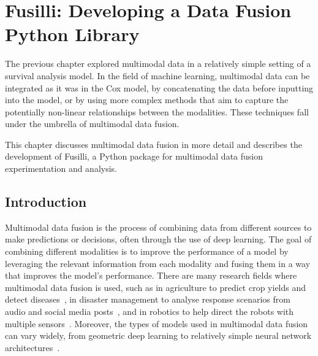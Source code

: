 \chapter{Fusilli: Developing a Data Fusion Python Library}
\label{fusilli_development}

The previous chapter explored multimodal data in a relatively simple setting of a survival analysis model.
In the field of machine learning, multimodal data can be integrated as it was in the Cox model, by concatenating the data before inputting into the model, or by using more complex methods that aim to capture the potentially non-linear relationships between the modalities.
These techniques fall under the umbrella of multimodal data fusion.

This chapter discusses multimodal data fusion in more detail and describes the development of Fusilli, a Python package for multimodal data fusion experimentation and analysis.

\section{Introduction}

Multimodal data fusion is the process of combining data from different sources to make predictions or decisions, often through the use of deep learning.
The goal of combining different modalities is to improve the performance of a model by leveraging the relevant information from each modality and fusing them in a way that improves the model's performance.
There are many research fields where multimodal data fusion is used, such as in agriculture to predict crop yields and detect diseases~\cite{s.s.gopiMultimodalMachineLearning2023, patilRiceFusionMultimodalityData2022}, in disaster management to analyse response scenarios from audio and social media posts~\cite{algiriyageMultisourceMultimodalData2021}, and in robotics to help direct the robots with multiple sensors~\cite{duanMultimodalSensorsMLBased2022}.
Moreover, the types of models used in multimodal data fusion can vary widely, from geometric deep learning to relatively simple neural network architectures~\cite{cuiDeepMultimodalFusion2022}.



